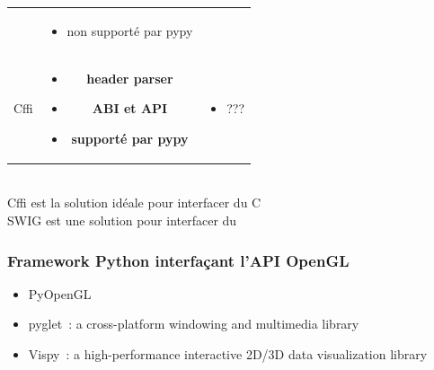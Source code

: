 \begin{frame}
\begin{center}
\begin{tabular}{ccc}
\begin{minipage}[t]{.2\linewidth}
\begin{itemize}
        \end{itemize}
      \end{minipage} &
      \begin{minipage}[t]{.45\linewidth}
        \tiny
        \begin{itemize}
          \item non supporté par pypy
        \end{itemize}
      \end{minipage} \\[1em]
      Cffi &
      \begin{minipage}[t]{.2\linewidth}
        \tiny
        \begin{itemize}
        \item \textbf{header parser}
        \item \textbf{ABI et API}
        \item \textbf{supporté par pypy}
        \end{itemize}
      \end{minipage} &
      \begin{minipage}[t]{.45\linewidth}
        \tiny
        \begin{itemize}
        \item ???
        \end{itemize}
      \end{minipage}
    \end{tabular} \\[1em]
    \alert{Cffi est la solution idéale pour interfacer du C} \\[.5em]
    \alert{SWIG est une solution pour interfacer du \Cpp}
  \end{center}
\end{frame}

\begin{frame}
  \frametitle{Framework Python interfaçant l'API OpenGL} %
  \begin{itemize}
    \item PyOpenGL
    \item pyglet~: a cross-platform windowing and multimedia library
    \item Vispy~: a high-performance interactive 2D/3D data visualization library
  \end{itemize}
\end{frame}

